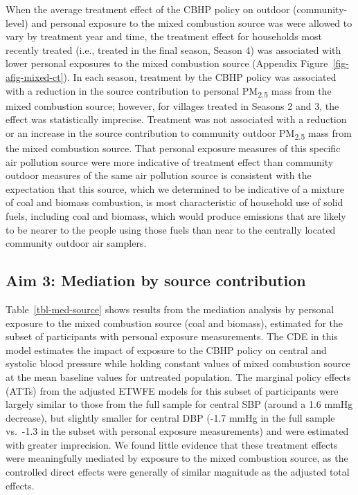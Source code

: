 \documentclass[
  letterpaper,
  DIV=11,
  numbers=noendperiod]{scrartcl}
\begin{document}
When the average treatment effect of the CBHP policy on outdoor
(community-level) and personal exposure to the mixed combustion source
was were allowed to vary by treatment year and time, the treatment
effect for households most recently treated (i.e., treated in the final
season, Season 4) was associated with lower personal exposures to the
mixed combustion source (Appendix Figure~\ref{fig-afig-mixed-ct}). In
each season, treatment by the CBHP policy was associated with a
reduction in the source contribution to personal PM\textsubscript{2.5}
mass from the mixed combustion source; however, for villages treated in
Seasons 2 and 3, the effect was statistically imprecise. Treatment was
not associated with a reduction or an increase in the source
contribution to community outdoor PM\textsubscript{2.5} mass from the
mixed combustion source. That personal exposure measures of this
specific air pollution source were more indicative of treatment effect
than community outdoor measures of the same air pollution source is
consistent with the expectation that this source, which we determined to
be indicative of a mixture of coal and biomass combustion, is most
characteristic of household use of solid fuels, including coal and
biomass, which would produce emissions that are likely to be nearer to
the people using those fuels than near to the centrally located
community outdoor air samplers.

\hypertarget{aim-3-mediation-by-source-contribution}{%
\subsection{Aim 3: Mediation by source
contribution}\label{aim-3-mediation-by-source-contribution}}

Table~\ref{tbl-med-source} shows results from the mediation analysis by
personal exposure to the mixed combustion source (coal and biomass),
estimated for the subset of participants with personal exposure
measurements. The CDE in this model estimates the impact of exposure to
the CBHP policy on central and systolic blood pressure while holding
constant values of mixed combustion source at the mean baseline values
for untreated population. The marginal policy effects (ATTs) from the
adjusted ETWFE models for this subset of participants were largely
similar to those from the full sample for central SBP (around a 1.6 mmHg
decrease), but slightly smaller for central DBP (-1.7 mmHg in the full
sample vs.~-1.3 in the subset with personal exposure measurements) and
were estimated with greater imprecision. We found little evidence that
these treatment effects were meaningfully mediated by exposure to the
mixed combustion source, as the controlled direct effects were generally
of similar magnitude as the adjusted total effects.
\end{document}
